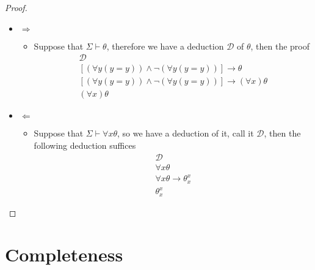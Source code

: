 \begin{proof}
    \begin{itemize}
        \item $ \Rightarrow $ 
        \begin{itemize}
            \item Suppose that $ \Sigma \vdash \theta$, therefore we have a deduction $ \mathcal{D}$ of $ \theta$, then the proof
                \begin{gather*}
                    \mathcal{D}\\
                    \left[ \left( \forall y \left( y =  y \right) \right) \land  \neg \left( \forall y \left( y =  y \right) \right) \right] \rightarrow \theta \tag{taut. PC}\\
                    \left[ \left( \forall y \left( y =  y \right) \right) \land  \neg \left( \forall y \left( y =  y \right) \right) \right] \rightarrow \left(  \forall  x \right)\theta \tag{QR}\\
                    \left(  \forall x \right) \theta \tag{PC}
                \end{gather*}
        \end{itemize}
        \item $ \Leftarrow $
        \begin{itemize}
            \item Suppose that $ \Sigma \vdash \forall x \theta$, so we have a deduction of it, call it  $\mathcal{D}$, then the following deduction suffices
            \begin{gather*}
               \mathcal{D} \\
               \forall x \theta\\
               \forall x \theta \rightarrow \theta _{x}^{x}\\
                \theta _{x}^{x}
            \end{gather*}
        \end{itemize}
    \end{itemize}
\end{proof}


\section{Completeness}







